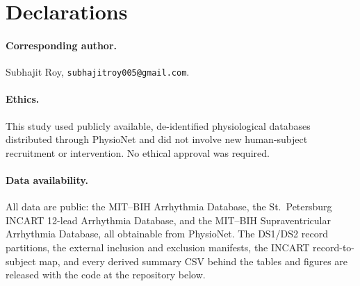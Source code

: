\section*{Declarations}

\paragraph{Corresponding author.} Subhajit Roy,
\texttt{subhajitroy005@gmail.com}.

\paragraph{Ethics.} This study used publicly available, de-identified
physiological databases distributed through PhysioNet
\cite{goldberger2000physiobank,moody2001impact,greenwald1990svdb} and did not
involve new human-subject recruitment or intervention. No ethical approval was
required.

\paragraph{Data availability.} All data are public: the MIT--BIH Arrhythmia
Database, the St.\ Petersburg INCART 12-lead Arrhythmia Database, and the
MIT--BIH Supraventricular Arrhythmia Database, all obtainable from PhysioNet.
The DS1/DS2 record partitions, the external inclusion and exclusion manifests,
the INCART record-to-subject map, and every derived summary CSV behind the
tables and figures are released with the code at the repository below.

